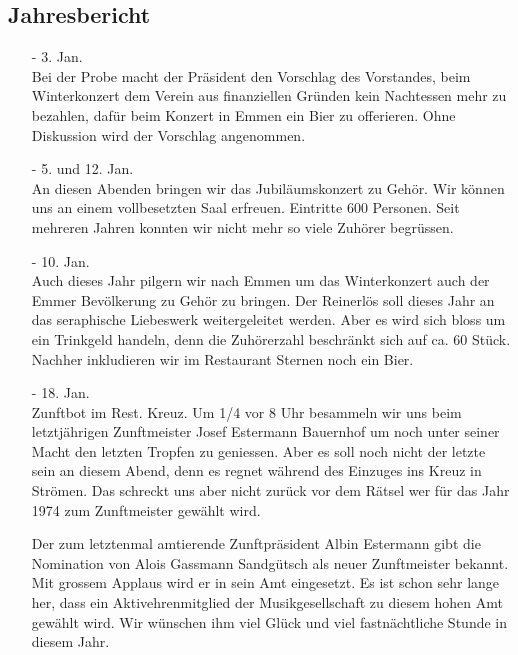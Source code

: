 \begin{multicols}{2}

    \section{Jahresbericht}

    \begin{itemize}
        \item[-]3. Jan.\\
        Bei der Probe macht der Präsident den Vorschlag
        des Vorstandes, beim Winterkonzert dem Verein aus finanziellen
        Gründen kein Nachtessen mehr zu bezahlen, dafür beim
        Konzert in Emmen ein Bier zu offerieren. Ohne
        Diskussion wird der Vorschlag angenommen.

        \item[-]5. und 12. Jan.\\
        An diesen Abenden bringen wir das Jubiläumskonzert
        zu Gehör. Wir können uns an einem vollbesetzten
        Saal erfreuen. Eintritte 600 Personen. Seit mehreren Jahren
        konnten wir nicht mehr so viele Zuhörer begrüssen.

        \item[-]10. Jan.\\
        Auch dieses Jahr pilgern wir nach Emmen um das
        Winterkonzert auch der Emmer Bevölkerung zu Gehör zu
        bringen. Der Reinerlös soll dieses Jahr an das seraphische
        Liebeswerk weitergeleitet werden. Aber es wird sich bloss um ein
        Trinkgeld handeln, denn die Zuhörerzahl beschränkt sich auf
        ca. 60 Stück. Nachher inkludieren wir im Restaurant
        Sternen noch ein Bier.

        \item[-]18. Jan.\\
        Zunftbot im Rest. Kreuz. Um 1/4 vor 8 Uhr besammeln
        wir uns beim letztjährigen Zunftmeister Josef Estermann
        Bauernhof um noch unter seiner Macht den letzten Tropfen
        zu geniessen. Aber es soll noch nicht der letzte sein an diesem
        Abend, denn es regnet während des Einzuges ins Kreuz in Strömen.
        Das schreckt uns aber nicht zurück
        vor dem Rätsel wer für das Jahr 1974 zum Zunftmeister
        gewählt wird.

        Der zum letztenmal amtierende Zunftpräsident
        Albin Estermann gibt die Nomination von Alois
        Gassmann Sandgütsch als neuer Zunftmeister bekannt.
        Mit grossem Applaus wird er in sein Amt eingesetzt.
        Es ist schon sehr lange her, dass ein Aktivehrenmitglied
        der Musikgesellschaft zu diesem hohen Amt gewählt
        wird. Wir wünschen ihm viel Glück und viel fastnächtliche
        Stunde in diesem Jahr.


\end{itemize}
\end{multicols}
